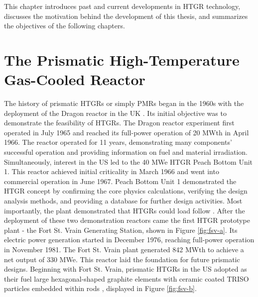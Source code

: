 This chapter introduces past and current developments in \gls{HTGR} technology, discusses the motivation behind the development of this thesis, and summarizes the objectives of the following chapters.

\section{The Prismatic High-Temperature Gas-Cooled Reactor}
\label{sec:pmr}

The history of prismatic \glspl{HTGR} or simply \glspl{PMR} began in the 1960s with the deployment of the Dragon reactor in the \gls{UK} \cite{brey_development_2001}.
Its initial objective was to demonstrate the feasibility of \glspl{HTGR}.
The Dragon reactor experiment first operated in July 1965 and reached its full-power operation of 20 MWth in April 1966.
The reactor operated for 11 years, demonstrating many components' successful operation and providing information on fuel and material irradiation.
Simultaneously, interest in the \gls{US} led to the 40 MWe \gls{HTGR} Peach Bottom Unit 1.
This reactor achieved initial criticality in March 1966 and went into commercial operation in June 1967.
Peach Bottom Unit 1 demonstrated the \gls{HTGR} concept by confirming the core physics calculations, verifying the design analysis methods, and providing a database for further design activities.
Most importantly, the plant demonstrated that \glspl{HTGR} could load follow \cite{brey_development_2001}.
After the deployment of these two demonstration reactors came the first \gls{HTGR} prototype plant - the Fort St. Vrain Generating Station, shown in Figure \ref{fig:fsv-a}.
Its electric power generation started in December 1976, reaching full-power operation in November 1981.
The Fort St. Vrain plant generated 842 MWth to achieve a net output of 330 MWe.
This reactor laid the foundation for future prismatic designs.
Beginning with Fort St. Vrain, prismatic HTGRs in the \gls{US} adopted as their fuel large hexagonal-shaped graphite elements with ceramic coated \gls{TRISO} particles embedded within rods \cite{brey_development_2001}, displayed in Figure \ref{fig:fsv-b}.

